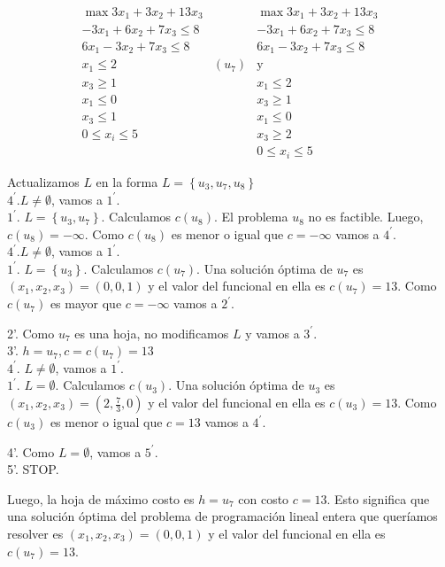 \documentclass[10pt]{article}
\begin{document}
\[
\begin{array}{ccc}
\max 3 x_{1}+3 x_{2}+13 x_{3} & & \max 3 x_{1}+3 x_{2}+13 x_{3} \\
-3 x_{1}+6 x_{2}+7 x_{3} \leq 8 & & -3 x_{1}+6 x_{2}+7 x_{3} \leq 8 \\
6 x_{1}-3 x_{2}+7 x_{3} \leq 8 & & 6 x_{1}-3 x_{2}+7 x_{3} \leq 8 \\
x_{1} \leq 2 & \left(u_{7}\right) & \mathrm{y} \\
x_{3} \geq 1 & & x_{1} \leq 2  \tag{8}\\
x_{1} \leq 0 & & x_{3} \geq 1 \\
x_{3} \leq 1 & & x_{1} \leq 0 \\
0 \leq x_{i} \leq 5 & & x_{3} \geq 2 \\
& & 0 \leq x_{i} \leq 5
\end{array}
\]

Actualizamos $L$ en la forma $L=\left\{u_{3}, u_{7}, u_{8}\right\}$\\
$4^{\prime} . L \neq \emptyset$, vamos a $1^{\prime}$.\\
$1^{\prime}$. $L=\left\{u_{3}, u_{7}\right\}$. Calculamos $c\left(u_{8}\right)$. El problema $u_{8}$ no es factible. Luego, $c\left(u_{8}\right)=-\infty$. Como $c\left(u_{8}\right)$ es menor o igual que $c=-\infty$ vamos a $4^{\prime}$.\\
$4^{\prime} . L \neq \emptyset$, vamos a $1^{\prime}$.\\
$1^{\prime}$. $L=\left\{u_{3}\right\}$. Calculamos $c\left(u_{7}\right)$. Una solución óptima de $u_{7}$ es $\left(x_{1}, x_{2}, x_{3}\right)=(0,0,1)$ y el valor del funcional en ella es $c\left(u_{7}\right)=13$. Como $c\left(u_{7}\right)$ es mayor que $c=-\infty$ vamos a $2^{\prime}$.

2'. Como $u_{7}$ es una hoja, no modificamos $L$ y vamos a $3^{\prime}$.\\
3'. $h=u_{7}, c=c\left(u_{7}\right)=13$\\
$4^{\prime}$. $L \neq \emptyset$, vamos a $1^{\prime}$.\\
$1^{\prime}$. $L=\emptyset$. Calculamos $c\left(u_{3}\right)$. Una solución óptima de $u_{3}$ es $\left(x_{1}, x_{2}, x_{3}\right)=\left(2, \frac{7}{3}, 0\right)$ y el valor del funcional en ella es $c\left(u_{3}\right)=13$. Como $c\left(u_{3}\right)$ es menor o igual que $c=13$ vamos a $4^{\prime}$.

4'. Como $L=\emptyset$, vamos a $5^{\prime}$.\\
5'. STOP.

Luego, la hoja de máximo costo es $h=u_{7}$ con costo $c=13$. Esto significa que una solución óptima del problema de programación lineal entera que queríamos resolver es $\left(x_{1}, x_{2}, x_{3}\right)=(0,0,1)$ y el valor del funcional en ella es $c\left(u_{7}\right)=13$.
\end{document}

